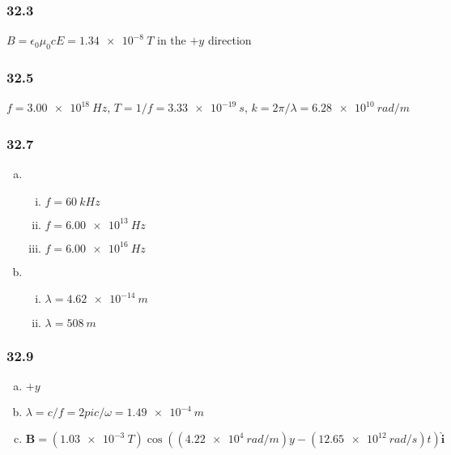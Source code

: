 \documentclass{article}
\begin{document}
\subsubsection{32.3}

$B = \epsilon_0 \mu_0 c E = \qty{1.34e-8}{T}$ in the $+y$ direction

\subsubsection{32.5}

$f = \qty{3.00e18}{Hz}$, $T = 1 / f = \qty{3.33e-19}{s}$, $k = 2 \pi / \lambda = \qty{6.28e10}{rad/m}$

\subsubsection{32.7}

\begin{enumerate}[(a)]
  \item

        \begin{enumerate}[(i)]
          \item $f = \qty{60}{kHz}$

          \item $f = \qty{6.00e13}{Hz}$

          \item $f = \qty{6.00e16}{Hz}$
        \end{enumerate}

  \item

        \begin{enumerate}[(i)]
          \item $\lambda = \qty{4.62e-14}{m}$

          \item $\lambda = \qty{508}{m}$
        \end{enumerate}
\end{enumerate}

\subsubsection{32.9}

\begin{enumerate}[(a)]
  \item $+y$

  \item $\lambda = c / f = 2 pi c / \omega = \qty{1.49e-4}{m}$

  \item $\mathbf{B} = (\qty{1.03e-3}{T}) \cos ((\qty{4.22e4}{rad/m}) y - (\qty{12.65e12}{rad/s}) t) \hat{\mathbf{i}}$
\end{enumerate}
\end{document}
